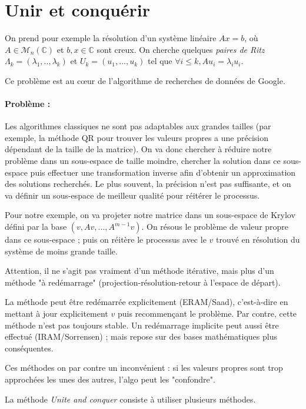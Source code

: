 \documentclass{article}
\begin{document}
\section{Unir et conquérir}


On prend pour exemple la résolution d'un système linéaire $Ax=b$, où $A \in \mathcal{M}_n(\mathbb{C})$ et $b,x\in \mathbb{C}$ sont creux. On cherche quelques \emph{paires de Ritz} $\Lambda_k = (\lambda_1,..,\lambda_k)$ et $U_k = (u_1,...,u_k)$ tel que $\forall i \leq k, Au_i = \lambda_i u_i$.

Ce problème est au cœur de l'algorithme de recherches de données de Google.
\bigskip

\paragraph{Problème :}
Les algorithmes classiques ne sont pas adaptables aux grandes tailles (par exemple, la méthode QR pour trouver les valeurs propres a une précision dépendant de la taille de la matrice). On va donc chercher à réduire notre problème dans un sous-espace de taille moindre, chercher la solution dans ce sous-espace puis effectuer une transformation inverse afin d'obtenir un approximation des solutions recherchés. Le plus souvent, la précision n'est pas suffisante, et on va définir un sous-espace de meilleur qualité pour réitérer le processus.

Pour notre exemple, on va projeter notre matrice dans un sous-espace de Krylov défini par la base $(v, Av, ..., A^{m-1}v)$. On résous le problème de valeur propre dans ce sous-espace ; puis on réitère le processus avec le $v$ trouvé en résolution du système de moins grande taille.

Attention, il ne s'agit pas vraiment d'un méthode itérative, mais plus d'un méthode "à redémarrage" (projection-résolution-retour à l'espace de départ).
\bigskip

La méthode peut être redémarrée explicitement (ERAM/Saad), c'est-à-dire en mettant à jour explicitement $v$ puis recommençant le problème. Par contre, cette méthode n'est pas toujours stable.
Un redémarrage implicite peut aussi être effectué (IRAM/Sorrensen) ; mais repose sur des bases mathématiques plus conséquentes.

Ces méthodes on par contre un inconvénient : si les valeurs propres sont trop approchées les unes des autres, l'algo peut les "confondre".
\bigskip


La méthode \emph{Unite and conquer} consiste à utiliser plusieurs méthodes.
\end{document}
